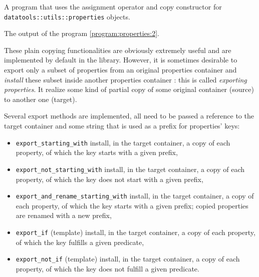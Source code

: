 \begin{program}[h]
\caption{A program that uses the assignment operator and copy constructor
for  \texttt{datatools::utils::properties} objects.}
\label{program:properties:2}
\end{program}

\begin{sample}[h]
\caption{The output of the program \ref{program:properties:2}.}
\label{sample:properties:2}
\end{sample}

These plain copying functionalities are obviously extremely useful and
are implemented  by default in  the library. However, it  is sometimes
desirable  to export  only a  subset  of properties  from an  original
properties  container and \emph{install}  these subset  inside another
properties container : this  is called \emph{exporting properties}. It
realize some kind of partial  copy of some original container (source)
to another one (target).

Several  export methods  are  implemented,  all need  to  be passed  a
reference to  the target container and  some string that is  used as a
prefix for properties' keys:

\begin{itemize}

\item   \texttt{export\_starting\_with}   install,   in   the   target
  container, a copy  of each property, of which the  key starts with a
  given prefix,

\item  \texttt{export\_not\_starting\_with}  install,  in  the  target
  container, a copy of each property,  of which the key does not start
  with a given prefix,

\item  \texttt{export\_and\_rename\_starting\_with}  install,  in  the
  target container, a  copy of each property, of  which the key starts
  with  a given  prefix;  copied  properties are  renamed  with a  new
  prefix,

\item \texttt{export\_if} (template) install, in the target container,
  a  copy  of  each  property,  of  which the  key  fulfills  a  given
  predicate,

\item  \texttt{export\_not\_if}  (template)  install,  in  the  target
  container,  a copy  of  each property,  of  which the  key does  not
  fulfill a given predicate.

\end{itemize}

